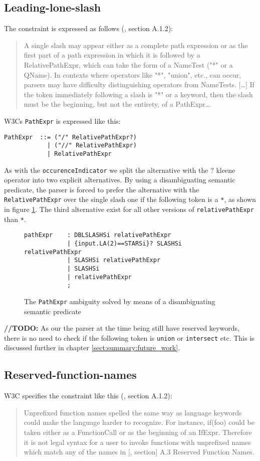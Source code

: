 \subsection{Leading-lone-slash}
The constraint is expressed as follows (\cite{w3c00}, section A.1.2):
\begin{quote}
A single slash may appear either as a complete path expression or as the first part of a path expression in which it is followed by a RelativePathExpr, which can take the form of a NameTest ("*" or a QName). In contexts where operators like "*", "union", etc., can occur, parsers may have difficulty distinguishing operators from NameTests. [\ldots] If the token immediately following a slash is "*" or a keyword, then the slash must be the beginning, but not the entirety, of a PathExpr\ldots
\end{quote}

W3Cs \verb!PathExpr! is expressed like this:
\begin{verbatim}
PathExpr  ::= ("/" RelativePathExpr?)
            | ("//" RelativePathExpr)
            | RelativePathExpr
\end{verbatim}

As with the \verb!occurenceIndicator! we split the alternative with the $?$ kleene operator into two explicit alternatives. By using a disambiguating semantic predicate, the parser is forced to prefer the alternative with the \verb!RelativePathExpr! over the single slash one if the following token is a \verb!*!, as shown in figure \ref{fig:leadingSlash}. The third alternative exist for all other versions of \verb!relativePathExpr! than \verb!*!.
\begin{figure}[h!]
\begin{verbatim}
pathExpr    : DBLSLASHSi relativePathExpr
            | {input.LA(2)==STARSi}? SLASHSi relativePathExpr
            | SLASHSi relativePathExpr
            | SLASHSi
            | relativePathExpr
            ;
\end{verbatim}
\caption[The \texttt{PathExpr} ambiguity solved]{The \texttt{PathExpr} ambiguity solved by means of a disambiguating semantic predicate}
\label{fig:leadingSlash}
\end{figure}

\textbf{\LARGE //TODO:} As our the parser at the time being still have reserved keywords, there is no need to check if the following token is \verb!union! or \verb!intersect! etc. This is discussed further in chapter \ref{sect:summary:future_work}.

\subsection{Reserved-function-names}
W3C specifies the constraint like this (\cite{w3c00}, section A.1.2):
\begin{quote}
Unprefixed function names spelled the same way as language keywords could make the language harder to recognize. For instance, if(foo) could be taken either as a FunctionCall or as the beginning of an IfExpr. Therefore it is not legal syntax for a user to invoke functions with unprefixed names which match any of the names in [\cite{w3c00}, section] A.3 Reserved Function Names.
\end{quote}

